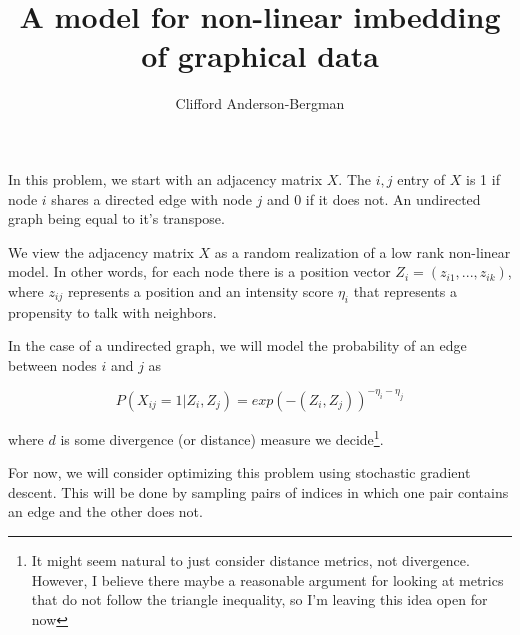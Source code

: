 \documentclass[11pt]{amsart}
\title{A model for non-linear imbedding of graphical data}
\author{Clifford Anderson-Bergman}
\begin{document}
\maketitle

In this problem, we start with an adjacency matrix $X$. The $i,j$ entry of $X$ is 1 if node $i$ shares a directed edge with node $j$ and 0 if it does not. An undirected graph being equal to it's transpose. 

We view the adjacency matrix $X$ as a random realization of a low rank non-linear model. In other words, for each node there is a position vector $Z_i = (z_{i1},..., z_{ik})$, where $z_{ij}$ represents a position and an intensity score $\eta_i$ that represents a propensity to talk with neighbors. 

In the case of a undirected graph, we will model the probability of an edge between nodes $i$ and $j$ as

\[
P(X_{ij} = 1 | Z_i, Z_j) =  exp( -(Z_i, Z_j)) ^ {-\eta_i - \eta_j}
\]

where $d$ is some divergence (or distance) measure we decide\footnote{It might seem natural to just consider distance metrics, not divergence. However, I believe there maybe a reasonable argument for looking at metrics that do not follow the triangle inequality, so I'm leaving this idea open for now}. 

For now, we will consider optimizing this problem using stochastic gradient descent. This will be done by sampling pairs of indices in which one pair contains an edge and the other does not. 
\end{document}
